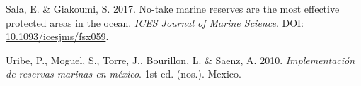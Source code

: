 \documentclass[12pt,]{article}
\begin{document}
\hypertarget{ref-sala_2017-69}{}
Sala, E. \& Giakoumi, S. 2017. No-take marine reserves are the most
effective protected areas in the ocean. \emph{ICES Journal of Marine
Science}. DOI:
\href{https://doi.org/10.1093/icesjms/fsx059}{10.1093/icesjms/fsx059}.

\hypertarget{ref-uribe_2010-u2}{}
Uribe, P., Moguel, S., Torre, J., Bourillon, L. \& Saenz, A. 2010.
\emph{Implementación de reservas marinas en méxico}. 1st ed. (nos.).
Mexico.
\end{document}
